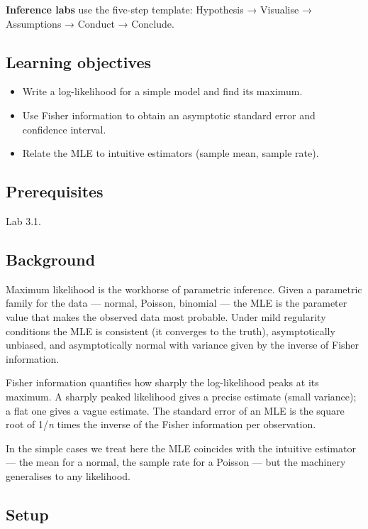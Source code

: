 \documentclass[
]{article}
\author{}
\date{\vspace{-2.5em}}
\providecommand{\tightlist}{%
  \setlength{\itemsep}{0pt}\setlength{\parskip}{0pt}}
\begin{document}
\textbf{Inference labs} use the five-step template: Hypothesis →
Visualise → Assumptions → Conduct → Conclude.

\subsection{Learning objectives}\label{learning-objectives}

\begin{itemize}
\tightlist
\item
  Write a log-likelihood for a simple model and find its maximum.
\item
  Use Fisher information to obtain an asymptotic standard error and
  confidence interval.
\item
  Relate the MLE to intuitive estimators (sample mean, sample rate).
\end{itemize}

\subsection{Prerequisites}\label{prerequisites}

Lab 3.1.

\subsection{Background}\label{background}

Maximum likelihood is the workhorse of parametric inference. Given a
parametric family for the data --- normal, Poisson, binomial --- the MLE
is the parameter value that makes the observed data most probable. Under
mild regularity conditions the MLE is consistent (it converges to the
truth), asymptotically unbiased, and asymptotically normal with variance
given by the inverse of Fisher information.

Fisher information quantifies how sharply the log-likelihood peaks at
its maximum. A sharply peaked likelihood gives a precise estimate (small
variance); a flat one gives a vague estimate. The standard error of an
MLE is the square root of 1/\emph{n} times the inverse of the Fisher
information per observation.

In the simple cases we treat here the MLE coincides with the intuitive
estimator --- the mean for a normal, the sample rate for a Poisson ---
but the machinery generalises to any likelihood.

\subsection{Setup}\label{setup}
\end{document}

